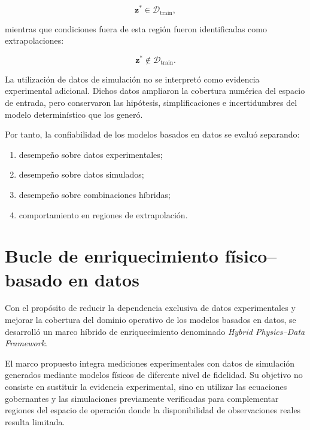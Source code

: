 \begin{equation}
\mathbf{z}^{*}
\in
\mathcal{D}_{\mathrm{train}},
\end{equation}

mientras que condiciones fuera de esta región fueron identificadas como extrapolaciones:

\begin{equation}
\mathbf{z}^{*}
\notin
\mathcal{D}_{\mathrm{train}}.
\end{equation}

La utilización de datos de simulación no se interpretó como evidencia experimental adicional. Dichos datos ampliaron la cobertura numérica del espacio de entrada, pero conservaron las hipótesis, simplificaciones e incertidumbres del modelo determinístico que los generó.

Por tanto, la confiabilidad de los modelos basados en datos se evaluó separando:

\begin{enumerate}
    \item desempeño sobre datos experimentales;
    \item desempeño sobre datos simulados;
    \item desempeño sobre combinaciones híbridas;
    \item comportamiento en regiones de extrapolación.
\end{enumerate}

\section{Bucle de enriquecimiento físico--basado en datos}
\label{sec:hybrid_physics_data_framework}

Con el propósito de reducir la dependencia exclusiva de datos experimentales y mejorar la cobertura del dominio operativo de los modelos basados en datos, se desarrolló un marco híbrido de enriquecimiento denominado \textit{Hybrid Physics--Data Framework}.

El marco propuesto integra mediciones experimentales con datos de simulación generados mediante modelos físicos de diferente nivel de fidelidad. Su objetivo no consiste en sustituir la evidencia experimental, sino en utilizar las ecuaciones gobernantes y las simulaciones previamente verificadas para complementar regiones del espacio de operación donde la disponibilidad de observaciones reales resulta limitada.

